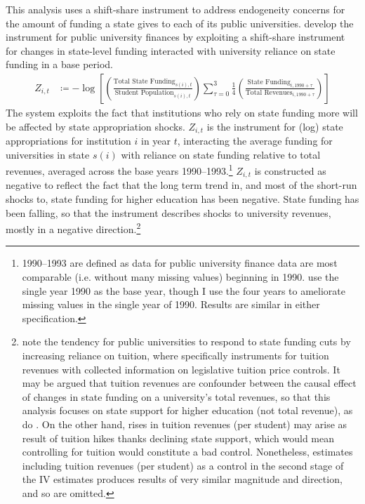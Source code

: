 This analysis uses a shift-share instrument to address endogeneity concerns for the amount of funding a state gives to each of its public universities.
\cite{NBERw23736,NBERw27885} develop the instrument for public university finances by exploiting a shift-share instrument for changes in state-level funding interacted with university reliance on state funding in a base period.
\begin{align}
    \label{eqn:public-instrument}
    Z_{i,t} &\coloneqq - \log \left[
    \left( \frac{\text{Total State Funding}_{s(i),t}}{\text{Student Population}_{s(i),t}} \right)
    \sum_{\tau = 0}^{3} \frac 14
    \left( \frac{\text{State Funding}_{i,1990 + \tau}}{\text{Total Revenues}_{i,1990 + \tau}} \right) \right]
\end{align}
The system exploits the fact that institutions who rely on state funding more will be affected by state appropriation shocks.
$Z_{i,t}$ is the instrument for (log) state appropriations for institution $i$ in year $t$, interacting the average funding for universities in state $s(i)$ with reliance on state funding relative to total revenues, averaged across the base years 1990--1993.\footnote{
    1990--1993 are defined as data for public university finance data are most comparable (i.e. without many missing values) beginning in 1990.
    \cite{NBERw23736} use the single year 1990 as the base year, though I use the four years to ameliorate missing values in the single year of 1990.
    Results are similar in either specification.
}
$Z_{i,t}$ is constructed as negative to reflect the fact that the long term trend in, and most of the short-run shocks to, state funding for higher education has been negative.
State funding has been falling, so that the instrument describes shocks to university revenues, mostly in a negative direction.\footnote{
    \label{foot:control}
    \cite{NBERw27885} note the tendency for public universities to respond to state funding cuts by increasing reliance on tuition, where \cite{NBERw23736} specifically instruments for tuition revenues with collected information on legislative tuition price controls.
    It may be argued that tuition revenues are confounder between the causal effect of changes in state funding on a university's total revenues, so that this analysis focuses on state support for higher education (not total revenue), as do \cite{NBERw27885}.
    On the other hand, rises in tuition revenues (per student) may arise as result of tuition hikes thanks declining state support, which would mean controlling for tuition would constitute a bad control.
    Nonetheless, estimates including tuition revenues (per student) as a control in the second stage of the IV estimates produces results of very similar magnitude and direction, and so are omitted.
}
